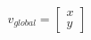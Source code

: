 \documentclass[preview]{standalone}
\begin{document}
\begin{align*}
v_{global} = \begin{bmatrix} x \\ y \end{bmatrix}
\end{align*}
\end{document}

